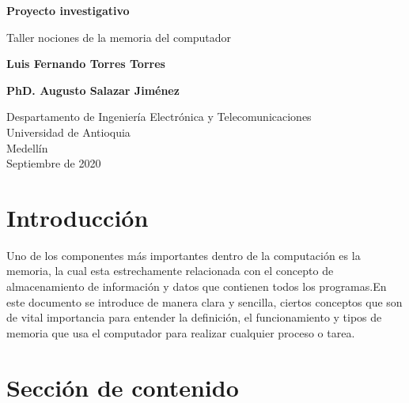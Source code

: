 \documentclass{article}
\begin{document}
\begin{titlepage}
    \begin{center}
        \vspace*{1cm}
            
        \Huge
        \textbf{Proyecto investigativo}
        
            
        \vspace{0.5cm}
        \LARGE
        Taller nociones de la memoria del computador
            
        \vspace{1.5cm}
            
        \textbf{Luis Fernando Torres Torres}
        
        \vspace{4cm}
            
        \textbf{PhD. Augusto Salazar Jiménez}
            
        \vfill
            
        \vspace{0.8cm}
            
        \Large
        Despartamento de Ingeniería Electrónica y Telecomunicaciones\\
        Universidad de Antioquia\\
        Medellín\\
        Septiembre de 2020
            
    \end{center}
\end{titlepage}

\tableofcontents%

\newpage

\section{Introducción}\label{intro}
Uno de los componentes más importantes dentro de la computación es la memoria, la cual esta estrechamente relacionada con el concepto de almacenamiento de información y datos que contienen todos los programas.En este documento se introduce de manera clara y sencilla, ciertos conceptos que son de vital importancia para entender la definición, el funcionamiento y tipos de memoria que usa el computador para realizar cualquier proceso o tarea.

\section{Sección de contenido}
\end{document}
